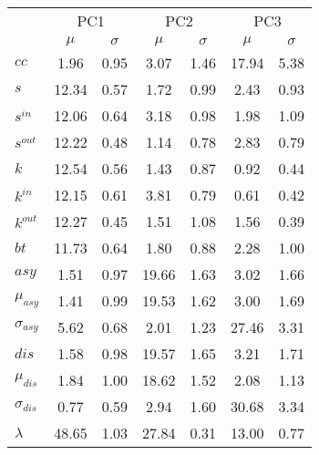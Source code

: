 \begin{center}
\begin{tabular}{| l | c | c | c | c | c | c |}\cline{2-7}
\multicolumn{1}{c|}{} & \multicolumn{2}{c|}{PC1}          & \multicolumn{2}{c|}{PC2} & \multicolumn{2}{c|}{PC3}  \\\cline{2-7}\multicolumn{1}{c|}{} & $\mu$            & $\sigma$ & $\mu$         & $\sigma$ & $\mu$ & $\sigma$  \\\hline
$cc$ & 1.96  & 0.95  & 3.07  & 1.46  & 17.94  & 5.38 \\\hline
$s$ & 12.34  & 0.57  & 1.72  & 0.99  & 2.43  & 0.93 \\
$s^{in}$ & 12.06  & 0.64  & 3.18  & 0.98  & 1.98  & 1.09 \\
$s^{out}$ & 12.22  & 0.48  & 1.14  & 0.78  & 2.83  & 0.79 \\
$k$ & 12.54  & 0.56  & 1.43  & 0.87  & 0.92  & 0.44 \\
$k^{in}$ & 12.15  & 0.61  & 3.81  & 0.79  & 0.61  & 0.42 \\
$k^{out}$ & 12.27  & 0.45  & 1.51  & 1.08  & 1.56  & 0.39 \\
$bt$ & 11.73  & 0.64  & 1.80  & 0.88  & 2.28  & 1.00 \\\hline
$asy$ & 1.51  & 0.97  & 19.66  & 1.63  & 3.02  & 1.66 \\
$\mu_{asy}$ & 1.41  & 0.99  & 19.53  & 1.62  & 3.00  & 1.69 \\
$\sigma_{asy}$ & 5.62  & 0.68  & 2.01  & 1.23  & 27.46  & 3.31 \\
$dis$ & 1.58  & 0.98  & 19.57  & 1.65  & 3.21  & 1.71 \\
$\mu_{dis}$ & 1.84  & 1.00  & 18.62  & 1.52  & 2.08  & 1.13 \\
$\sigma_{dis}$ & 0.77  & 0.59  & 2.94  & 1.60  & 30.68  & 3.34 \\\hline\hline
$\lambda$ & 48.65  & 1.03  & 27.84  & 0.31  & 13.00  & 0.77 \\
\hline\end{tabular}
\end{center}